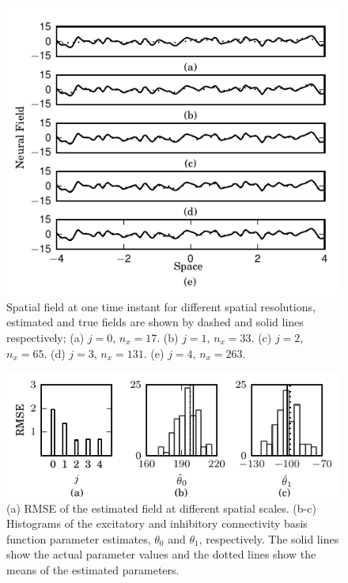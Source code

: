 \documentclass[journal,a4paper]{IEEEtran}
\begin{document}
\begin{figure}[!h] 
 \centering
 \includegraphics[scale=1]{./Graph/Field.pdf}
 \caption{Spatial field at one time instant for different spatial resolutions, estimated and true fields are shown by dashed and solid lines respectively; (a) $j=0$, $n_x=17$. (b) $j=1$, $n_x=33$. (c) $j=2$, $n_x=65$. (d) $j=3$, $n_x=131$. (e) $j=4$, $n_x=263$.}
 \label{fig:FieldEstimates}
 \end{figure} 
\begin{figure}[!h] 
 \centering
 \includegraphics[scale=1]{./Graph/Hist.pdf}
 \caption{(a) RMSE of the estimated field at different spatial scales. (b-c) Histograms of the excitatory and inhibitory connectivity basis function parameter estimates, $\theta_0$ and $\theta_1$, respectively. The solid lines show the actual parameter values and the dotted lines show the means of the estimated parameters.}
 \label{fig:ParametersHistogram}
 \end{figure} 
\end{document}
